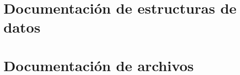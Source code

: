 \documentclass[twoside]{book}
\newcommand{\+}{\discretionary{\mbox{\scriptsize$\hookleftarrow$}}{}{}}
\newcommand{\clearemptydoublepage}{%
    \newpage{\pagestyle{empty}\cleardoublepage}%
  }
\begin{document}
\chapter{Documentación de estructuras de datos}









\chapter{Documentación de archivos}





































  \backmatter
  \newpage
  \clearemptydoublepage
  \printindex
\end{document}
